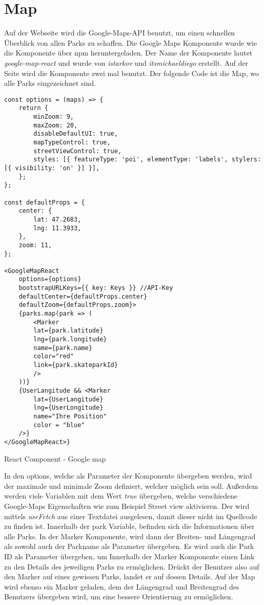 \section{Map}
\label{map}

Auf der Webseite wird die Google-Maps-API benutzt, um einen schnellen Überblick von allen Parks
zu schaffen. Die Google Maps Komponente wurde wie die \underline{} Komponente über npm 
heruntergeladen. Der Name der Komponente lautet \textit{google-map-react} und wurde von \textit{istarkov}
und \textit{itsmichaeldiego} erstellt. Auf der Seite wird die Komponente zwei mal benutzt. Der folgende 
Code ist die Map, wo alle Parks eingezeichnet sind.

\newpage

\begin{code}[htp]
\begin{lstlisting}
const options = (maps) => {
    return {
        minZoom: 9,
        maxZoom: 20,
        disableDefaultUI: true,
        mapTypeControl: true,
        streetViewControl: true,
        styles: [{ featureType: 'poi', elementType: 'labels', stylers: [{ visibility: 'on' }] }],
    };
};

const defaultProps = {
    center: {
        lat: 47.2683,
        lng: 11.3933,
    },
    zoom: 11,
};
    
<GoogleMapReact
    options={options}
    bootstrapURLKeys={{ key: Keys }} //API-Key
    defaultCenter={defaultProps.center}
    defaultZoom={defaultProps.zoom}>
    {parks.map(park => (
        <Marker
        lat={park.latitude}
        lng={park.longitude}
        name={park.name}
        color="red"
        link={park.skateparkId}
        />  
    ))}
    {UserLangitude && <Marker
        lat={UserLangitude}
        lng={UserLongitude}
        name="Ihre Position"
        color = "blue"
    />}
</GoogleMapReact>}
\end{lstlisting}
\caption{React Component - Google map}
\end{code}

In den options, welche als Parameter der Komponente übergeben werden, wird der maximale und minimale Zoom 
definiert, welcher möglich sein soll. Außerdem werden viele Variablen mit dem Wert \textit{true} übergeben, 
welche verschiedene Google-Maps Eigenschaften wie zum Beispiel Street view aktivieren. Der \underline{}
wird mittels \textit{useFetch} aus einer Textdatei ausgelesen, damit dieser nicht im Quellcode zu 
finden ist. Innerhalb der park Variable, befinden sich die 
Informationen über alle Parks. In der Marker Komponente, wird dann der Breiten- und Längengrad als sowohl auch
der Parkname als Parameter übergeben. Es wird auch die Park ID als Parameter übergeben, um Innerhalb der 
Marker Komponente einen Link zu den Details des jeweiligen Parks zu ermöglichen. Drückt der Benutzer also auf den Marker 
auf eines gewissen Parks, landet er auf dessen Details. Auf der Map wird ebenso ein Marker geladen, dem 
der Längengrad und Breitengrad des Benutzers übergeben wird, um eine bessere Orientierung zu ermöglichen.

